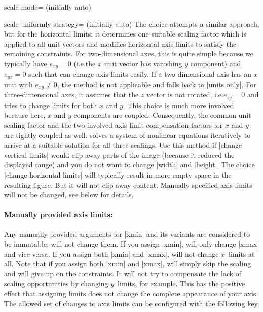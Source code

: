 \begin{pgfplotskey}{scale mode= (initially auto)}
\begin{pgfplotskey}{scale uniformly strategy= (initially auto)%
    }
        The choice  attempts a similar
        approach, but for the horizontal limits: it determines one suitable
        scaling factor which is applied to all unit vectors and modifies
        horizontal axis limits to satisfy the remaining constraints. For
        two-dimensional axes, this is quite simple because we typically have
        $e_{xy} = 0$ (i.e.\@ the $x$ unit vector has vanishing $y$ component)
        and $e_{yx}=0$ such that \PGFPlots{} can change axis limits easily. If
        a two-dimensional axis has an $x$ unit with $e_{xy} \neq 0$, the method
        is not applicable and falls back to |units only|. For three-dimensional
        axes, it assumes that the $z$ vector is not rotated, i.e.\@ $e_{zy} =
        0$ and tries to change limits for both $x$ and $y$. This choice is much
        more involved because here, $x$ and $y$ components are coupled.
        Consequently, the common unit scaling factor and the two involved axis
        limit compensation factors for $x$ and $y$ are tightly coupled as well.
        \PGFPlots{} solves a system of nonlinear equations iteratively to
        arrive at a suitable solution for all three scalings. Use this method
        if |change vertical limits| would clip away parts of the image (because
        it reduced the displayed range) and you do not want to change |width|
        and |height|. The choice |change horizontal limits| will typically
        result in more empty space in the resulting figure. But it will not
        clip away content. Manually specified axis limits will not be changed,
        see below for details.
    \end{pgfplotskey}


    \paragraph{Manually provided axis limits:}

    Any manually provided arguments for |xmin| and its variants are considered
    to be immutable; \PGFPlots{} will not change them. If you assign |xmin|,
    \PGFPlots{} will only change |xmax| and vice versa. If you assign both
    |xmin| and |xmax|, \PGFPlots{} will not change $x$~limits at all. Note that
    if you assign both |xmin| and |xmax|, \PGFPlots{} will simply skip the
    scaling and will give up on the constraints. It will not try to compensate
    the lack of scaling opportunities by changing $y$~limits, for example. This
    has the positive effect that assigning limits does not change the complete
    appearance of your axis. The allowed set of changes to axis limits can be
    configured with the following key.



\end{pgfplotskey}

